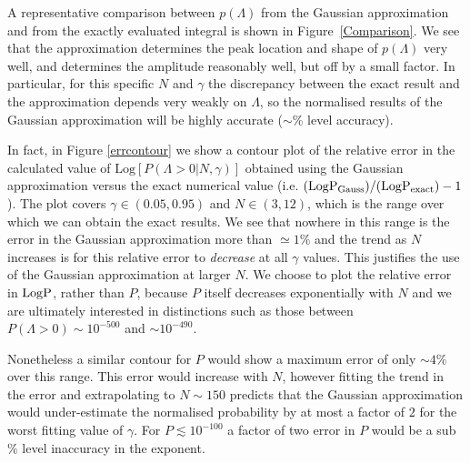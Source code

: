 \documentclass[12pt]{article}
\begin{document}

A representative comparison between $p(\Lambda)$ from the Gaussian approximation and from the exactly evaluated integral is shown in Figure~\ref{Comparison}. We see that the approximation determines the peak location and shape of $p(\Lambda)$ very well, and determines the amplitude reasonably well, but off by a small factor. In particular, for this specific $N$ and $\gamma$ the discrepancy between the exact result and the approximation depends very weakly on $\Lambda$, so the normalised results of the Gaussian approximation will be highly accurate ($\sim\%$ level accuracy).

In fact, in Figure \ref{errcontour} we show a contour plot of the relative error in the calculated value of $\mathrm{Log} \left[P(\Lambda>0|N,\gamma)\right]$ obtained using the Gaussian approximation versus the exact numerical value (i.e. $(\rm{Log} P_{\rm Gauss})/(\rm{Log} P_{\rm exact}) -1$). The plot covers $\gamma \in (0.05,0.95)$ and $N \in (3,12)$, which is the range over which we can obtain the exact results. We see that nowhere in this range is the error in the Gaussian approximation more than $\simeq 1\%$ and the trend as $N$ increases is for this relative error to \emph{decrease} at all $\gamma$ values. This justifies the use of the Gaussian approximation at larger $N$. We choose to plot the relative error in $\rm{Log} P$, rather than $P$, because $P$ itself decreases exponentially with $N$ and we are ultimately interested in distinctions such as those between $P(\Lambda>0) \sim 10^{-500}$ and $\sim 10^{-490}$.

Nonetheless a similar contour for $P$ would show a maximum error of only $\sim 4\%$ over this range. This error would increase with $N$, however fitting the trend in the error and extrapolating to $N\sim 150$ predicts that the Gaussian approximation would under-estimate the normalised probability by at most a factor of $2$ for the worst fitting value of $\gamma$. For $P\lesssim 10^{-100}$ a factor of two error in $P$ would be a sub $\%$ level inaccuracy in the exponent.
\end{document}
